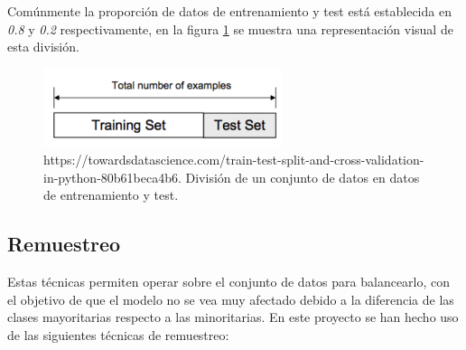 \begin{enumerate}
                    Comúnmente la proporción de datos de entrenamiento y test está establecida en \textit{0.8} y \textit{0.2} respectivamente, en la figura \ref{DataSplitImage} se muestra una representación visual de esta división.


                    \begin{figure}[h]
                        \centering
                        \includegraphics[width=7cm]{archivos/Datos/DataSplit}
                        \caption{https://towardsdatascience.com/train-test-split-and-cross-validation-in-python-80b61beca4b6. División de un conjunto de datos en datos de entrenamiento y test.}
                        \label{DataSplitImage}
                     \end{figure}

            \end{enumerate}



        \subsection{Remuestreo}


            Estas técnicas permiten operar sobre el conjunto de datos para balancearlo, con el objetivo de que el modelo no se vea muy afectado debido a la diferencia de las clases mayoritarias respecto a las minoritarias. En este proyecto se han hecho uso de las siguientes técnicas de remuestreo:

